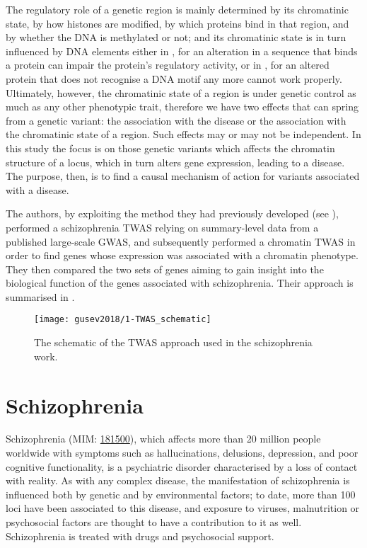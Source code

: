 \documentclass[../main.tex]{subfiles}
\begin{document}
The regulatory role of a genetic region is mainly determined by its 
chromatinic state, \ie by how histones are modified, by which proteins 
bind in that region, and by whether the DNA is methylated or not; and 
its chromatinic state is in turn influenced by DNA elements either in 
\cis, for an alteration in a sequence that binds a protein can impair 
the protein's regulatory activity, or in \trans, for an altered protein 
that does not recognise a DNA motif any more cannot work properly. 
Ultimately, however, the chromatinic state of a region is under genetic 
control as much as any other phenotypic trait, therefore we have two 
effects that can spring from a genetic variant: the association with the 
disease or the association with the chromatinic state of a region. Such 
effects may or may not be independent. In this study the focus is on 
those genetic variants which affects the chromatin structure of a locus, 
which in turn alters gene expression, leading to a disease. The purpose, 
then, is to find a causal mechanism of action for variants associated 
with a disease.

The authors, by exploiting the method they had previously developed (see 
), performed a schizophrenia TWAS relying on 
summary-level data from a published large-scale GWAS, and subsequently 
performed a chromatin TWAS in order to find genes whose expression was 
associated with a chromatin phenotype. They then compared the two sets 
of genes aiming to gain insight into the biological function of the 
genes associated with schizophrenia. Their approach is summarised in 
.

\begin{figure}
	\texttt{[image: gusev2018/1-TWAS\_schematic]}
	\caption{The schematic of the TWAS approach used in the 
schizophrenia work.}
\end{figure}

\section{Schizophrenia}

Schizophrenia (MIM: \href{https://omim.org/entry/181500}{181500}), which 
affects more than 20 million people worldwide with symptoms such as 
hallucinations, delusions, depression, and poor cognitive functionality, 
is a psychiatric disorder characterised by a loss of contact with 
reality. As with any complex disease, the manifestation of schizophrenia 
is influenced both by genetic and by environmental factors; to date, 
more than 100 loci have been associated to this disease, and exposure to 
viruses, malnutrition or psychosocial factors are thought to have a 
contribution to it as well. Schizophrenia is treated with drugs and 
psychosocial support.
\end{document}
